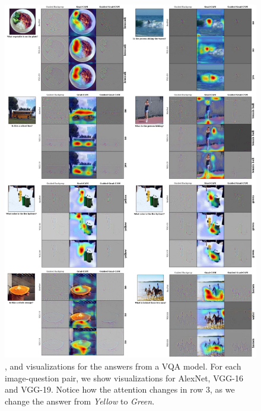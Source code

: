 \begin{figure}
     \centering
     \includegraphics[scale=0.30]{figures/vqa_sup.jpg}
     \caption{\gb{}, \gcam{} and \cgb{}  visualizations for the answers from a VQA model.
     For each image-question pair, we show visualizations for AlexNet, VGG-16 and VGG-19.
     Notice how the attention changes in row 3, as we change the answer from \emph{Yellow} to \emph{Green}.}
     \label{fig:vqa_supp}
\end{figure}

